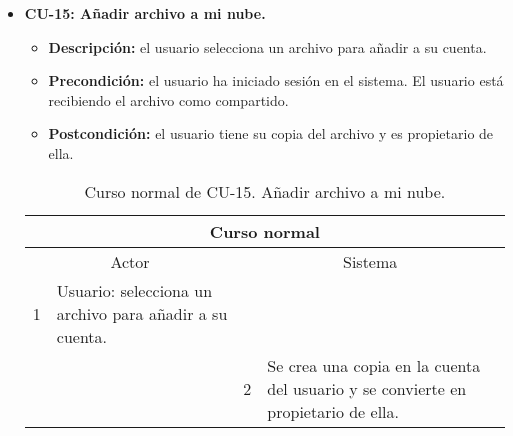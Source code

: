 \begin{itemize}
	\item \textbf{CU-15: Añadir archivo a mi nube.}
	\begin{itemize}
		\item \textbf{Descripción:} el usuario selecciona un archivo para añadir a su cuenta.
		\item \textbf{Precondición:} el usuario ha iniciado sesión en el sistema. El usuario está recibiendo el archivo como compartido.
		\item \textbf{Postcondición:} el usuario tiene su copia del archivo y es propietario de ella.
	\end{itemize}
	\begin{table}[H]
		\centering
		\begin{tabular}{|p{0.3cm}|p{5cm}|p{0.3cm}|p{5cm}|}
			\hline
			\multicolumn{4}{|c|}{Curso normal} \\ \hline
			\multicolumn{2}{|c|}{Actor} & \multicolumn{2}{|c|}{Sistema} \\ \hline
			1 & Usuario: selecciona un archivo para añadir a su cuenta. &  &  \\ \hline
			&  & 2 & Se crea una copia en la cuenta del usuario y se convierte en propietario de ella. \\ \hline
		\end{tabular}
		\caption{Curso normal de CU-15. Añadir archivo a mi nube.}
		\label{tabla:cu15-normal}
	\end{table}
\end{itemize}

